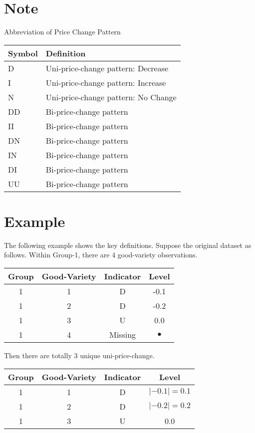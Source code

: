 
\section*{Note}
Abbreviation of Price Change Pattern

\begin{tabular}{ll}
	\hline\hline
	Symbol & Definition                          \\ \hline
	D      & Uni-price-change pattern: Decrease  \\
	I      & Uni-price-change pattern: Increase  \\
	N      & Uni-price-change pattern: No Change \\ \hline
	DD     & Bi-price-change pattern             \\
	II     & Bi-price-change pattern             \\
	DN     & Bi-price-change pattern             \\
	IN     & Bi-price-change pattern             \\
	DI     & Bi-price-change pattern             \\
	UU     & Bi-price-change pattern             \\ \hline\hline
\end{tabular}

\section*{Example}

The following example shows the key definitions. Suppose the original dataset as follows. Within Group-1, there are 4 good-variety observations.

\begin{tabular}{cccc}
	\hline\hline
	Group & Good-Variety & Indicator &    Level    \\ \hline
	1   &      1       &     D     &    -0.1     \\
	1   &      2       &     D     &    -0.2     \\
	1   &      3       &     U     &     0.0     \\
	1   &      4       &  Missing  & $ \bullet $ \\ \hline\hline
\end{tabular}

Then there are totally $ 3 $ unique uni-price-change.

\begin{tabular}{cccc}
	\hline\hline
	Group & Good-Variety & Indicator &      Level       \\ \hline
	1   &      1       &     D     & $ |-0.1| = 0.1 $ \\
	1   &      2       &     D     & $ |-0.2| = 0.2 $ \\
	1   &      3       &     U     &       0.0        \\ \hline\hline
\end{tabular}

